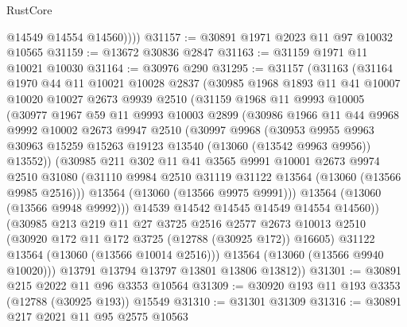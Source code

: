 \begin{lexlean}{RustCore}
\begin{coremodule}
            @14549
            @14554
            @14560))))
@31157 := @30891 @1971 @2023 @11 @97 @10032 @10565
@31159 := @13672 @30836 @2847
@31163 := @31159 @1971 @11 @10021 @10030
@31164 := @30976 @290
@31295 := @31157
    (@31163
      (@31164
        @1970
        @44
        @11
        @10021
        @10028
        @2837
        (@30985
          @1968
          @1893
          @11
          @41
          @10007
          @10020
          @10027
          @2673
          @9939
          @2510
          (@31159
            @1968
            @11
            @9993
            @10005
            (@30977
              @1967
              @59
              @11
              @9993
              @10003
              @2899
              (@30986
                @1966
                @11
                @44
                @9968
                @9992
                @10002
                @2673
                @9947
                @2510
                (@30997
                  @9968
                  (@30953
                    @9955
                    @9963
                    @30963
                    @15259
                    @15263
                    @19123
                    @13540
                    (@13060 (@13542 @9963 @9956))
                    @13552))
                (@30985
                  @211
                  @302
                  @11
                  @41
                  @3565
                  @9991
                  @10001
                  @2673
                  @9974
                  @2510
                  @31080
                  (@31110 @9984 @2510 @31119 @31122 @13564 (@13060 (@13566 @9985 @2516)))
                  @13564
                  (@13060 (@13566 @9975 @9991)))
                @13564
                (@13060 (@13566 @9948 @9992)))
              @14539
              @14542
              @14545
              @14549
              @14554
              @14560))
          (@30985
            @213
            @219
            @11
            @27
            @3725
            @2516
            @2577
            @2673
            @10013
            @2510
            (@30920 @172 @11 @172 @3725 (@12788 (@30925 @172)) @16605)
            @31122
            @13564
            (@13060 (@13566 @10014 @2516)))
          @13564
          (@13060 (@13566 @9940 @10020)))
        @13791
        @13794
        @13797
        @13801
        @13806
        @13812))
@31301 := @30891 @215 @2022 @11 @96 @3353 @10564
@31309 := @30920 @193 @11 @193 @3353 (@12788 (@30925 @193)) @15549
@31310 := @31301 @31309
@31316 := @30891 @217 @2021 @11 @95 @2575 @10563

\end{coremodule}
\end{lexlean}
